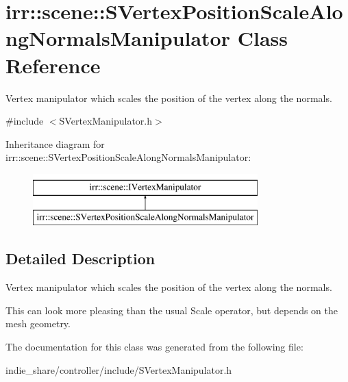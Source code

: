 \hypertarget{classirr_1_1scene_1_1SVertexPositionScaleAlongNormalsManipulator}{}\section{irr\+:\+:scene\+:\+:S\+Vertex\+Position\+Scale\+Along\+Normals\+Manipulator Class Reference}
\label{classirr_1_1scene_1_1SVertexPositionScaleAlongNormalsManipulator}


Vertex manipulator which scales the position of the vertex along the normals.  




{\ttfamily \#include $<$S\+Vertex\+Manipulator.\+h$>$}

Inheritance diagram for irr\+:\+:scene\+:\+:S\+Vertex\+Position\+Scale\+Along\+Normals\+Manipulator\+:\begin{figure}[H]
\begin{center}
\leavevmode
\includegraphics[height=2.000000cm]{classirr_1_1scene_1_1SVertexPositionScaleAlongNormalsManipulator}
\end{center}
\end{figure}


\subsection{Detailed Description}
Vertex manipulator which scales the position of the vertex along the normals. 

This can look more pleasing than the usual Scale operator, but depends on the mesh geometry. 

The documentation for this class was generated from the following file\+:\begin{DoxyCompactItemize}
\item 
indie\+\_\+share/controller/include/S\+Vertex\+Manipulator.\+h\end{DoxyCompactItemize}
